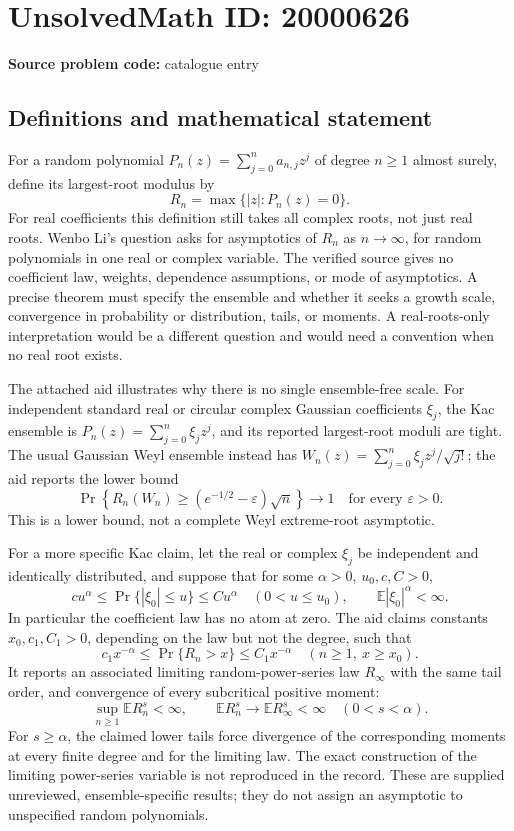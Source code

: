 \documentclass[11pt]{article}
\begin{document}
\section*{UnsolvedMath ID: 20000626}
\textbf{Source problem code:} catalogue entry
\subsection{Definitions and mathematical statement}
For a random polynomial \(P_n(z)=\sum_{j=0}^n a_{n,j}z^j\) of degree \(n\geq1\) almost surely, define its largest-root modulus by
\[
R_n=\max\{|z|:P_n(z)=0\}.
\]
For real coefficients this definition still takes all complex roots, not just real roots. Wenbo Li's question asks for asymptotics of \(R_n\) as \(n\to\infty\), for random polynomials in one real or complex variable. The verified source gives no coefficient law, weights, dependence assumptions, or mode of asymptotics. A precise theorem must specify the ensemble and whether it seeks a growth scale, convergence in probability or distribution, tails, or moments. A real-roots-only interpretation would be a different question and would need a convention when no real root exists.

The attached aid illustrates why there is no single ensemble-free scale. For independent standard real or circular complex Gaussian coefficients \(\xi_j\), the Kac ensemble is
\(P_n(z)=\sum_{j=0}^n\xi_jz^j\), and its reported largest-root moduli are tight. The usual Gaussian Weyl ensemble instead has
\(W_n(z)=\sum_{j=0}^n\xi_jz^j/\sqrt{j!}\); the aid reports the lower bound
\[
\Pr\left\{R_n(W_n)\geq(e^{-1/2}-\varepsilon)\sqrt n\right\}\longrightarrow1
\quad\text{for every }\varepsilon>0.
\]
This is a lower bound, not a complete Weyl extreme-root asymptotic.

For a more specific Kac claim, let the real or complex \(\xi_j\) be independent and identically distributed, and suppose that for some \(\alpha>0\), \(u_0,c,C>0\),
\[
c u^\alpha\leq\Pr\{|\xi_0|\leq u\}\leq C u^\alpha
\quad(0<u\leq u_0),\qquad
\mathbb E|\xi_0|^\alpha<\infty.
\]
In particular the coefficient law has no atom at zero. The aid claims constants \(x_0,c_1,C_1>0\), depending on the law but not the degree, such that
\[
c_1x^{-\alpha}\leq\Pr\{R_n>x\}\leq C_1x^{-\alpha}
\quad(n\geq1,\ x\geq x_0).
\]
It reports an associated limiting random-power-series law \(R_\infty\) with the same tail order, and convergence of every subcritical positive moment:
\[
\sup_{n\geq1}\mathbb E R_n^s<\infty,
\qquad \mathbb E R_n^s\longrightarrow\mathbb E R_\infty^s<\infty
\quad(0<s<\alpha).
\]
For \(s\geq\alpha\), the claimed lower tails force divergence of the corresponding moments at every finite degree and for the limiting law. The exact construction of the limiting power-series variable is not reproduced in the record. These are supplied unreviewed, ensemble-specific results; they do not assign an asymptotic to unspecified random polynomials.
\end{document}
